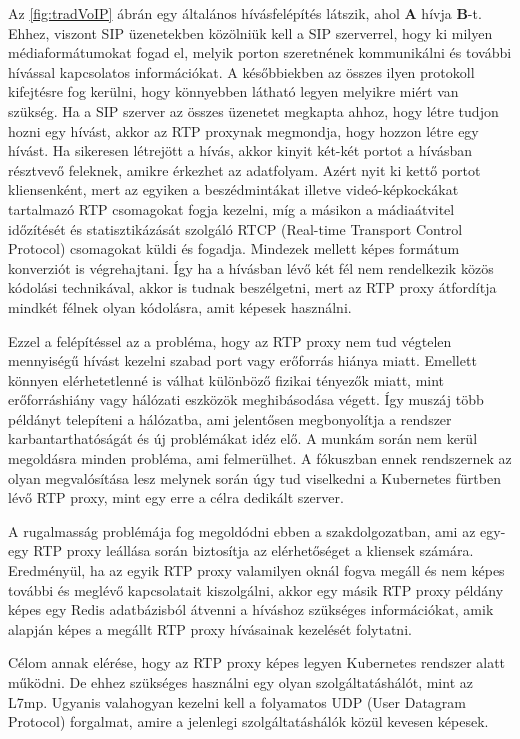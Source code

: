 Az \ref{fig:tradVoIP} ábrán egy általános hívásfelépítés látszik, ahol \textbf{A} hívja 
\textbf{B}-t. 
Ehhez, viszont SIP üzenetekben közölniük kell a SIP szerverrel, hogy ki milyen 
médiaformátumokat fogad el, melyik porton szeretnének kommunikálni és további hívással kapcsolatos információkat. A későbbiekben az összes ilyen protokoll kifejtésre fog
kerülni, hogy könnyebben látható legyen melyikre miért van szükség. Ha a SIP szerver
az összes üzenetet megkapta ahhoz, hogy létre tudjon hozni egy hívást, akkor az 
RTP proxynak megmondja, hogy hozzon létre egy hívást. Ha sikeresen létrejött a 
hívás, akkor kinyit két-két portot a hívásban résztvevő feleknek, amikre érkezhet
az adatfolyam. Azért nyit ki kettő portot kliensenként, mert az egyiken a
beszédmintákat illetve videó-képkockákat tartalmazó RTP csomagokat fogja
kezelni, míg a másikon a mádiaátvitel időzítését és statisztikázását szolgáló
RTCP (Real-time Transport Control Protocol) csomagokat küldi és fogadja. Mindezek mellett 
képes formátum konverziót is végrehajtani. Így ha a hívásban lévő két fél nem rendelkezik 
közös kódolási technikával, akkor is tudnak beszélgetni, mert az RTP proxy átfordítja 
mindkét félnek olyan kódolásra, amit képesek használni.

Ezzel a felépítéssel az a probléma, hogy az RTP proxy nem tud végtelen mennyiségű
hívást kezelni szabad port vagy erőforrás hiánya miatt. Emellett könnyen elérhetetlenné 
is válhat különböző fizikai tényezők miatt, mint erőforráshiány vagy hálózati eszközök 
meghibásodása végett. Így muszáj több példányt telepíteni a hálózatba, ami jelentősen 
megbonyolítja a rendszer karbantarthatóságát és új problémákat idéz elő. A munkám során
nem kerül megoldásra minden probléma, ami felmerülhet. A fókuszban ennek rendszernek az
olyan megvalósítása lesz melynek során úgy tud viselkedni a Kubernetes fürtben lévő
RTP proxy, mint egy erre a célra dedikált szerver.

A rugalmasság problémája fog megoldódni ebben a szakdolgozatban, ami az egy-egy RTP proxy
leállása során biztosítja az elérhetőséget a kliensek számára. Eredményül, ha az egyik
RTP proxy valamilyen oknál fogva megáll és nem képes további és meglévő kapcsolatait 
kiszolgálni, akkor egy másik RTP proxy példány képes egy Redis adatbázisból átvenni
a híváshoz szükséges információkat, amik alapján képes a megállt RTP proxy hívásainak
kezelését folytatni. 

Célom annak elérése, hogy az RTP proxy képes legyen Kubernetes rendszer alatt 
működni. De ehhez szükséges használni egy olyan szolgáltatáshálót, mint az L7mp. Ugyanis 
valahogyan kezelni kell a folyamatos UDP (User Datagram Protocol) forgalmat, amire
a jelenlegi szolgáltatáshálók közül kevesen képesek.

